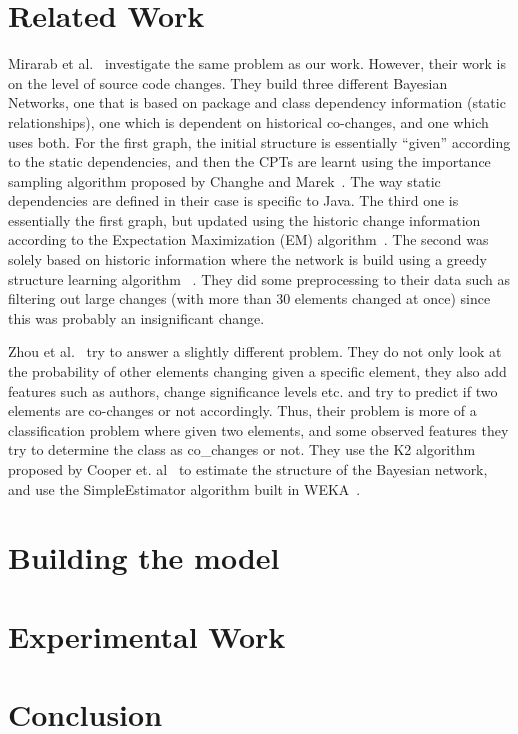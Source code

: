 \documentclass{article}
\begin{document}
\section{Related Work}
\label{rel-work}

Mirarab et al.~\cite{mirarab2007} investigate the same problem as our work. However, their work is on the level of source code changes. They build three
different Bayesian Networks, one that is based on package and class dependency information (static relationships), one which is dependent on historical
co-changes, and one which uses both. For the first graph, the initial structure is essentially ``given'' according to the static dependencies, and then the CPTs
are learnt using the importance sampling algorithm proposed by Changhe and Marek~\cite{yuan2003importance}. The way static dependencies are defined in their
case is specific to Java. The third one is essentially the first graph, but updated using the historic change information according to the Expectation
Maximization (EM) algorithm~\cite{dempster1977maximum}. The second was solely based on historic information where the network is build using a greedy structure
 learning algorithm~ \cite{friedman1996learning}. They did some preprocessing to their data such as filtering out large changes (with more than 30 elements
changed at once) since this was probably an insignificant change.

Zhou et al.~\cite{zhou2008} try to answer a slightly different problem. They do not only look at the probability of other elements changing given a specific
element, they also add features such as authors, change significance levels etc. and try to predict if two elements are co-changes or not accordingly. Thus,
their problem is more of a classification problem where given two elements, and some observed features they try to determine the class as co_changes or not.
They use the K2 algorithm proposed by Cooper et. al~\cite{cooper1992bayesian} to estimate the structure of the Bayesian network, and use the SimpleEstimator
algorithm built in WEKA~\cite{witten2005data}.

\section{Building the model}
\label{sec:model}

\section{Experimental Work}
\label{sec:exp}

\section{Conclusion}
\label{concl}




\end{document}
